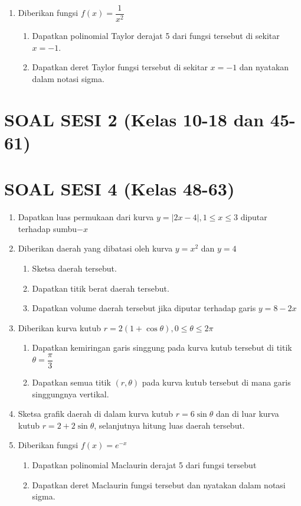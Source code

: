 \documentclass{article}
\begin{document}
\begin{enumerate}
	\item Diberikan fungsi $f(x)=\dfrac{1}{x^2}$
	\begin{enumerate}
		\item Dapatkan polinomial Taylor derajat 5 dari fungsi tersebut di sekitar $x=-1$.
		\item Dapatkan deret Taylor fungsi tersebut di sekitar $x=-1$ dan nyatakan dalam notasi sigma.
	\end{enumerate}
\end{enumerate}
\newpage
\section*{SOAL SESI 2 (Kelas 10-18 dan 45-61)}
\newpage
\section*{SOAL SESI 4 (Kelas 48-63)}
\begin{enumerate}
	\item Dapatkan luas permukaan dari kurva $y=|2x-4|,1\leq x\leq 3$ diputar terhadap sumbu$-x$
	\item Diberikan daerah yang dibatasi oleh kurva $y=x^2$ dan $y=4$
	\begin{enumerate}
		\item Sketsa daerah tersebut.
		\item Dapatkan titik berat daerah tersebut.
		\item Dapatkan volume daerah tersebut jika diputar terhadap garis $y=8-2x$
	\end{enumerate}
	\item Diberikan kurva kutub $r=2(1+\cos\theta),0\leq \theta\leq 2\pi$
	\begin{enumerate}
		\item Dapatkan kemiringan garis singgung pada kurva kutub tersebut di titik $\theta=\dfrac{\pi}{3}$
		\item Dapatkan semua titik $(r,\theta)$ pada kurva kutub tersebut di mana garis singgungnya vertikal.
	\end{enumerate}
	\item Sketsa grafik daerah di dalam kurva kutub $r=6\sin\theta$ dan di luar kurva kutub $r=2+2\sin\theta$, selanjutnya hitung luas daerah tersebut.
	\item Diberikan fungsi $f(x)=e^{-x}$
	\begin{enumerate}
		\item Dapatkan polinomial Maclaurin derajat 5 dari fungsi tersebut
		\item Dapatkan deret Maclaurin fungsi tersebut dan nyatakan dalam notasi sigma.
	\end{enumerate}
\end{enumerate}
\end{document}
